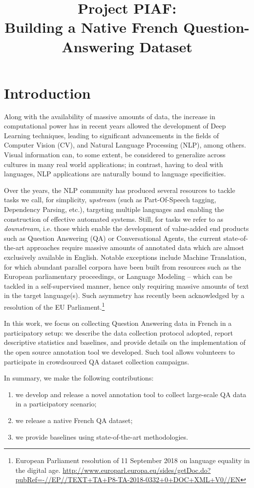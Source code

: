 \documentclass[10pt, a4paper]{article}
\title{Project PIAF:\\Building a Native French Question-Answering Dataset}
\begin{document}
\maketitleabstract

\section{Introduction}

Along with the availability of massive amounts of data, the increase in computational power has in recent years allowed the development of Deep Learning techniques, leading to significant advancements in the fields of Computer Vision (CV), and Natural Language Processing (NLP), among others. Visual information can, to some extent, be considered to generalize across cultures in many real world applications; in contrast, having to deal with languages, NLP applications are naturally bound to language specificities.

Over the years, the NLP community has produced several resources to tackle tasks we call, for simplicity, \emph{upstream} (such as Part-Of-Speech tagging, Dependency Parsing, etc.), targeting multiple languages and enabling the construction of effective automated systems. Still, for tasks we refer to as \emph{downstream}, i.e. those which enable the development of value-added end products such as Question Answering (QA) or Conversational Agents, the current state-of-the-art approaches require massive amounts of annotated data which are almost exclusively available in English. 
Notable exceptions include Machine Translation, for which abundant parallel corpora have been built from resources such as the European parliamentary proceedings, or Language Modeling -- which can be tackled in a self-supervised manner, hence only requiring massive amounts of text in the target language(s).
Such asymmetry has recently been acknowledged by a resolution of the EU Parliament.\footnote{European Parliament resolution of 11 September 2018 on language equality in the digital age. \url{http://www.europarl.europa.eu/sides/getDoc.do?pubRef=-//EP//TEXT+TA+P8-TA-2018-0332+0+DOC+XML+V0//EN}}

In this work, we focus on collecting Question Answering data in French in a participatory setup: we describe the data collection protocol adopted, report descriptive statistics and baselines, and provide details on the implementation of the open source annotation tool we developed. Such tool allows volunteers to participate in crowdsourced QA dataset collection campaigns.

In summary, we make the following contributions: 
\begin{enumerate}
    \item we develop and release a novel annotation tool to collect large-scale QA data in a participatory scenario;
    \item we release a native French QA dataset;
    \item we provide baselines using state-of-the-art methodologies.
\end{enumerate}
\end{document}
